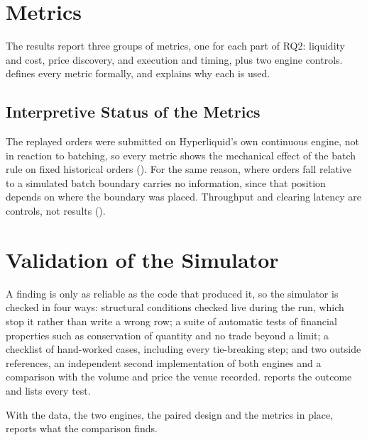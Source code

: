 \section{Metrics}
\label{sec:metrics}

The results report three groups of metrics, one for each part of RQ2: liquidity
and cost, price discovery, and execution and timing, plus two engine controls.
 defines every metric formally, and 
explains why each is used.

\subsection{Interpretive Status of the Metrics}
\label{sec:testable}

The replayed orders were submitted on Hyperliquid's own continuous engine,
not in reaction to batching, so every metric shows the mechanical effect of
the batch rule on fixed historical orders (). For
the same reason, where orders fall relative to a simulated batch boundary
carries no information, since that position depends on where the boundary
was placed. Throughput and clearing latency are controls, not results
().

\section{Validation of the Simulator}
\label{sec:validation}

A finding is only as reliable as the code that produced it, so the simulator
is checked in four ways: structural conditions checked live during the run,
which stop it rather than write a wrong row; a suite of automatic tests of
financial properties such as conservation of quantity and no trade beyond a
limit; a checklist of hand-worked cases, including every tie-breaking step;
and two outside references, an independent second implementation of both
engines and a comparison with the volume and price the venue recorded.
 reports the outcome and 
lists every test.

With the data, the two engines, the paired design and the metrics in place,
 reports what the comparison finds.
